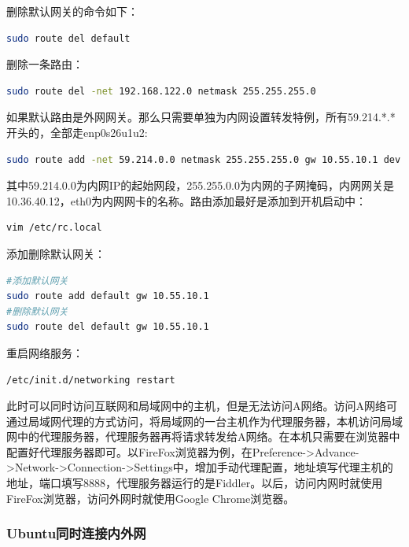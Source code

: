 \documentclass[letter]{book}
\begin{document}
删除默认网关的命令如下：

\begin{lstlisting}[language=Bash]
sudo route del default
\end{lstlisting}

删除一条路由：

\begin{lstlisting}[language=Bash]
sudo route del -net 192.168.122.0 netmask 255.255.255.0
\end{lstlisting}

如果默认路由是外网网关。那么只需要单独为内网设置转发特例，所有59.214.*.*开头的，全部走enp0s26u1u2:

\begin{lstlisting}[language=Bash]
sudo route add -net 59.214.0.0 netmask 255.255.255.0 gw 10.55.10.1 dev enp0s26u1u2
\end{lstlisting}

其中59.214.0.0为内网IP的起始网段，255.255.0.0为内网的子网掩码，内网网关是10.36.40.12，eth0为内网网卡的名称。路由添加最好是添加到开机启动中：

\begin{lstlisting}[language=Bash]
vim /etc/rc.local
\end{lstlisting}

添加删除默认网关：

\begin{lstlisting}[language=Bash]
#添加默认网关
sudo route add default gw 10.55.10.1
#删除默认网关
sudo route del default gw 10.55.10.1
\end{lstlisting}

重启网络服务：

\begin{lstlisting}[language=Bash]
/etc/init.d/networking restart
\end{lstlisting}

此时可以同时访问互联网和局域网中的主机，但是无法访问A网络。访问A网络可通过局域网代理的方式访问，将局域网的一台主机作为代理服务器，本机访问局域网中的代理服务器，代理服务器再将请求转发给A网络。在本机只需要在浏览器中配置好代理服务器即可。以FireFox浏览器为例，在Preference->Advance->Network->Connection->Settings中，增加手动代理配置，地址填写代理主机的地址，端口填写8888，代理服务器运行的是Fiddler。以后，访问内网时就使用FireFox浏览器，访问外网时就使用Google Chrome浏览器。


\subsubsection{Ubuntu同时连接内外网}
\end{document}
